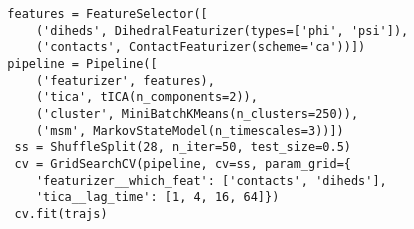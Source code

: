 \documentclass{article}
\begin{document}
\renewcommand{\theFancyVerbLine}{
  \sffamily\textcolor[rgb]{0.5,0.5,0.5}{\scriptsize\arabic{FancyVerbLine}}}


\begin{figure}
\begin{verbatim}
  features = FeatureSelector([
      ('diheds', DihedralFeaturizer(types=['phi', 'psi']),
      ('contacts', ContactFeaturizer(scheme='ca'))])
  pipeline = Pipeline([
      ('featurizer', features),
      ('tica', tICA(n_components=2)),
      ('cluster', MiniBatchKMeans(n_clusters=250)),
      ('msm', MarkovStateModel(n_timescales=3))])
   ss = ShuffleSplit(28, n_iter=50, test_size=0.5)
   cv = GridSearchCV(pipeline, cv=ss, param_grid={
      'featurizer__which_feat': ['contacts', 'diheds'],
      'tica__lag_time': [1, 4, 16, 64]})
   cv.fit(trajs)
\end{verbatim}
\end{figure}
\end{document}
